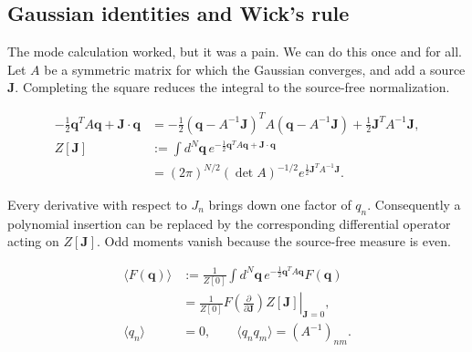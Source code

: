 \subsection{Gaussian identities and Wick's rule}

The mode calculation worked, but it was a pain.  We can do this once and for
all.  Let $A$ be a symmetric matrix for which the Gaussian converges, and add a
source $\mathbf J$.  Completing the square reduces the integral to the
source-free normalization.

\begin{align}
  -\frac12\mathbf q^TA\mathbf q+\mathbf J\cdot\mathbf q
  &=-\frac12(\mathbf q-A^{-1}\mathbf J)^T
  A(\mathbf q-A^{-1}\mathbf J)
  +\frac12\mathbf J^TA^{-1}\mathbf J,
  \label{eq:proposal-finite-gaussian-square}\\
  Z[\mathbf J]
  &:=\int d^N\mathbf q\,
  e^{-\frac12\mathbf q^TA\mathbf q+\mathbf J\cdot\mathbf q}
  \nonumber\\
  &=(2\pi)^{N/2}(\det A)^{-1/2}
  e^{\frac12\mathbf J^TA^{-1}\mathbf J}.
  \label{eq:proposal-finite-gaussian-generating-function}
\end{align}

Every derivative with respect to $J_n$ brings down one factor of $q_n$.
Consequently a polynomial insertion can be replaced by the corresponding
differential operator acting on $Z[\mathbf J]$.  Odd moments vanish because
the source-free measure is even.

\begin{align}
  \langle F(\mathbf q)\rangle
  &:=\frac1{Z[0]}\int d^N\mathbf q\,
  e^{-\frac12\mathbf q^TA\mathbf q}F(\mathbf q)
  \nonumber\\
  &=\left.
  \frac1{Z[0]}
  F\!\left(\frac{\partial}{\partial\mathbf J}\right)
  Z[\mathbf J]\right|_{\mathbf J=0},
  \label{eq:proposal-gaussian-source-derivatives}\\
  \langle q_n\rangle&=0,
  \qquad
  \langle q_nq_m\rangle=(A^{-1})_{nm}.
  \label{eq:proposal-finite-gaussian-two-point}
\end{align}

